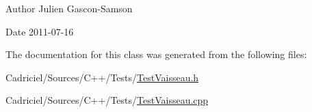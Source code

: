 \begin{DoxyAuthor}{Author}
Julien Gascon-\/\-Samson 
\end{DoxyAuthor}
\begin{DoxyDate}{Date}
2011-\/07-\/16 
\end{DoxyDate}


The documentation for this class was generated from the following files\-:\begin{DoxyCompactItemize}
\item 
Cadriciel/\-Sources/\-C++/\-Tests/\hyperlink{_test_vaisseau_8h}{Test\-Vaisseau.\-h}\item 
Cadriciel/\-Sources/\-C++/\-Tests/\hyperlink{_test_vaisseau_8cpp}{Test\-Vaisseau.\-cpp}\end{DoxyCompactItemize}
